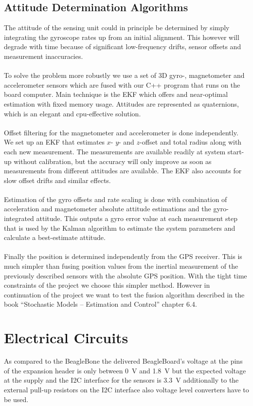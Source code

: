 \subsection{Attitude Determination Algorithms}
The attitude of the sensing unit could in principle be determined by simply integrating the gyroscope rates up from an initial alignment. This however will degrade with time because of significant low-frequency drifts, sensor offsets and measurement inaccuracies.
\\
\\
To solve the problem more robustly we use a set of 3D gyro-, magnetometer and accelerometer sensors which are fused with our C++ program that runs on the board computer. Main technique is the \ac{EKF} which offers and near-optimal estimation with fixed memory usage. Attitudes are represented as quaternions, which is an elegant and cpu-effective solution.
\\
\\
Offset filtering for the magnetometer and accelerometer is done independently.
We set up an \ac{EKF} that estimates $x$- $y$- and $z$-offset and total radius along with each new measurement.
The measurements are available readily at system start-up without calibration, but the accuracy will only improve as soon as measurements from different attitudes are available. The \ac{EKF} also accounts for slow offset drifts and similar effects.
\\
\\
Estimation of the gyro offsets and rate scaling is done with combination of acceleration and magnetometer absolute attitude estimations and the gyro-integrated attitude. This outputs a gyro error value at each measurement step that is used by the Kalman algorithm to estimate the system parameters and calculate a best-estimate attitude.
\\
\\
Finally the position is determined independently from the GPS receiver. This is much simpler than fusing position values from the inertial measurement of the previously described sensors with the absolute GPS position. With the tight time constraints of the project we choose this simpler method. However in continuation of the project we want to test the fusion algorithm described in the book ``Stochastic Models -- Estimation and Control'' chapter 6.4.

\FloatBarrier
\section{Electrical Circuits}

As compared to the BeagleBone the delivered BeagleBoard's voltage at the pins
of the expansion header is only between 0~V and 1.8~V but the expected voltage
at the supply and the I2C interface for the sensors is 3.3~V additionally to
the external pull-up resistors on the I2C interface also voltage level
converters have to be used.
